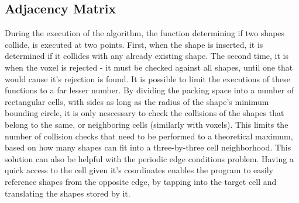 \documentclass[12pt, oneside]{report}
\begin{document}
\subsection{Adjacency Matrix}

During the execution of the algorithm, the function determining if two shapes collide, is executed at two points. First, when the shape is inserted, it is determined if it collides with any already existing shape. The second time, it is when the voxel is rejected - it must be checked against all shapes, until one that would cause it's rejection is found. It is possible to limit the executions of these functions to a far lesser number. By dividing the packing space into a number of rectangular cells, with sides as long as the radius of the shape's minimum bounding circle, it is only nescessary to check the collisions of the shapes that belong to the same, or neighboring cells (similarly with voxels). This limits the number of collision checks that need to be performed to a theoretical maximum, based on how many shapes can fit into a three-by-three cell neighborhood. \newline
This solution can also be helpful with the periodic edge conditions problem. Having a quick access to the cell given it's coordinates enables the program to easily reference shapes from the opposite edge, by tapping into the target cell and translating the shapes stored by it.
\end{document}
